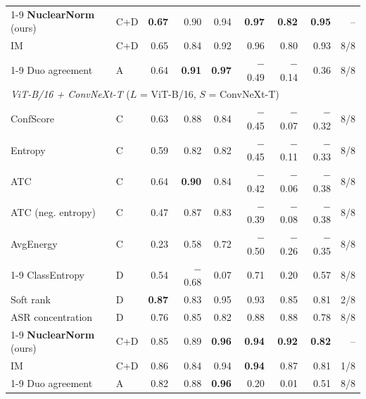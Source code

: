 \begin{table}[t]
\begin{tabular}{ll rrr rrr r}
\cmidrule(l){1-9}
\textbf{NuclearNorm} (ours) & C+D & \textbf{\phantom{-}0.67} & \phantom{-}0.90 & \phantom{-}0.94 & \textbf{\phantom{-}0.97} & \textbf{\phantom{-}0.82} & \textbf{\phantom{-}0.95} & -- \\
IM & C+D & \phantom{-}0.65 & \phantom{-}0.84 & \phantom{-}0.92 & \phantom{-}0.96 & \phantom{-}0.80 & \phantom{-}0.93 & 8/8 \\
\cmidrule(l){1-9}
Duo agreement & A & \phantom{-}0.64 & \textbf{\phantom{-}0.91} & \textbf{\phantom{-}0.97} & $-$0.49 & $-$0.14 & \phantom{-}0.36 & 8/8 \\
\midrule
\multicolumn{9}{l}{\textit{ViT-B/16 + ConvNeXt-T} \quad ($L$ = ViT-B/16, $S$ = ConvNeXt-T)} \\
ConfScore & C & \phantom{-}0.63 & \phantom{-}0.88 & \phantom{-}0.84 & $-$0.45 & $-$0.07 & $-$0.32 & 8/8 \\
Entropy & C & \phantom{-}0.59 & \phantom{-}0.82 & \phantom{-}0.82 & $-$0.45 & $-$0.11 & $-$0.33 & 8/8 \\
ATC & C & \phantom{-}0.64 & \textbf{\phantom{-}0.90} & \phantom{-}0.84 & $-$0.42 & $-$0.06 & $-$0.38 & 8/8 \\
ATC (neg. entropy) & C & \phantom{-}0.47 & \phantom{-}0.87 & \phantom{-}0.83 & $-$0.39 & $-$0.08 & $-$0.38 & 8/8 \\
AvgEnergy & C & \phantom{-}0.23 & \phantom{-}0.58 & \phantom{-}0.72 & $-$0.50 & $-$0.26 & $-$0.35 & 8/8 \\
\cmidrule(l){1-9}
ClassEntropy & D & \phantom{-}0.54 & $-$0.68 & \phantom{-}0.07 & \phantom{-}0.71 & \phantom{-}0.20 & \phantom{-}0.57 & 8/8 \\
Soft rank & D & \textbf{\phantom{-}0.87} & \phantom{-}0.83 & \phantom{-}0.95 & \phantom{-}0.93 & \phantom{-}0.85 & \phantom{-}0.81 & 2/8 \\
ASR concentration & D & \phantom{-}0.76 & \phantom{-}0.85 & \phantom{-}0.82 & \phantom{-}0.88 & \phantom{-}0.88 & \phantom{-}0.78 & 8/8 \\
\cmidrule(l){1-9}
\textbf{NuclearNorm} (ours) & C+D & \phantom{-}0.85 & \phantom{-}0.89 & \textbf{\phantom{-}0.96} & \textbf{\phantom{-}0.94} & \textbf{\phantom{-}0.92} & \textbf{\phantom{-}0.82} & -- \\
IM & C+D & \phantom{-}0.86 & \phantom{-}0.84 & \phantom{-}0.94 & \textbf{\phantom{-}0.94} & \phantom{-}0.87 & \phantom{-}0.81 & 1/8 \\
\cmidrule(l){1-9}
Duo agreement & A & \phantom{-}0.82 & \phantom{-}0.88 & \textbf{\phantom{-}0.96} & \phantom{-}0.20 & \phantom{-}0.01 & \phantom{-}0.51 & 8/8 \\

\end{tabular}
\end{table}

